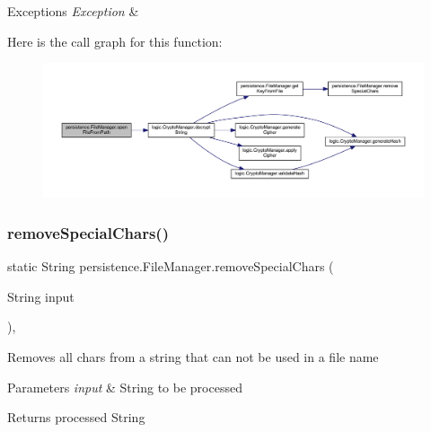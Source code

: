 \begin{DoxyExceptions}{Exceptions}
{\em Exception} & \\
\hline
\end{DoxyExceptions}
Here is the call graph for this function\+:\nopagebreak
\begin{figure}[H]
\begin{center}
\leavevmode
\includegraphics[width=350pt]{classpersistence_1_1_file_manager_adfbb7817aa088a174d2a78be57462e71_cgraph}
\end{center}
\end{figure}
\mbox{\label{classpersistence_1_1_file_manager_ab4359d704a98bbf6635b9027c3d137ca}} 
\subsubsection{\texorpdfstring{remove\+Special\+Chars()}{removeSpecialChars()}}
{\footnotesize\ttfamily static String persistence.\+File\+Manager.\+remove\+Special\+Chars (\begin{DoxyParamCaption}\item[{String}]{input }\end{DoxyParamCaption})\hspace{0.3cm}{\ttfamily [static]}, {\ttfamily [private]}}

Removes all chars from a string that can not be used in a file name 
\begin{DoxyParams}{Parameters}
{\em input} & String to be processed \\
\hline
\end{DoxyParams}
\begin{DoxyReturn}{Returns}
processed String 
\end{DoxyReturn}
\mbox{\label{classpersistence_1_1_file_manager_a0630ee2ca01aad2ec24cff07a764bbd2}} 
